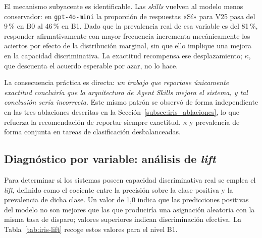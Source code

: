 El mecanismo subyacente es identificable. Las \textit{skills} vuelven al modelo
menos conservador: en \texttt{gpt-4o-mini} la proporción de respuestas «Sí»
para V25 pasa del 9\,\% en B0 al 46\,\% en B1. Dado que la prevalencia real de
esa variable es del 81\,\%, responder afirmativamente con mayor frecuencia
incrementa mecánicamente los aciertos por efecto de la distribución marginal,
sin que ello implique una mejora en la capacidad discriminativa. La exactitud
recompensa ese desplazamiento; $\kappa$, que descuenta el acuerdo esperable por
azar, no lo hace.

La consecuencia práctica es directa: \emph{un trabajo que reportase únicamente
exactitud concluiría que la arquitectura de Agent Skills mejora el sistema, y
tal conclusión sería incorrecta}. Este mismo patrón se observó de forma
independiente en las tres ablaciones descritas en la
Sección~\ref{subsec:iris_ablaciones}, lo que refuerza la recomendación de
reportar siempre exactitud, $\kappa$ y prevalencia de forma conjunta en tareas
de clasificación desbalanceadas.

\subsection{Diagnóstico por variable: análisis de \textit{lift}}
\label{subsec:iris_lift}

Para determinar si los sistemas poseen capacidad discriminativa real se emplea
el \textit{lift}, definido como el cociente entre la precisión sobre la clase
positiva y la prevalencia de dicha clase. Un valor de 1,0 indica que las
predicciones positivas del modelo no son mejores que las que produciría una
asignación aleatoria con la misma tasa de disparo; valores superiores indican
discriminación efectiva. La Tabla~\ref{tab:iris-lift} recoge estos valores para
el nivel B1.

